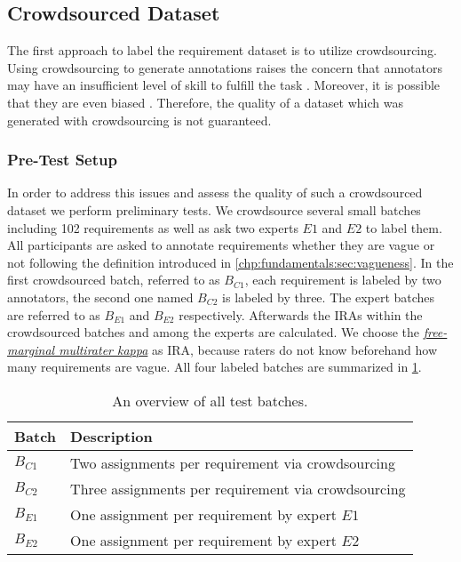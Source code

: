 \subsection{Crowdsourced Dataset}
\label{chp:study:sec:study_objects:crowdsourced_dataset}

The first approach to label the requirement dataset is to utilize crowdsourcing.
Using crowdsourcing to generate annotations raises the concern that annotators may have an insufficient level of skill to fulfill the task \parencite{Quinn:2011}.
Moreover, it is possible that they are even biased \parencite{Kittur:2008}.
Therefore, the quality of a dataset which was generated with crowdsourcing is not guaranteed.

\subsubsection{Pre-Test Setup}
In order to address this issues and assess the quality of such a crowdsourced dataset we perform preliminary tests.
We crowdsource several small batches including 102 requirements as well as ask two experts $E1$ and $E2$ to label them.
All participants are asked to annotate requirements whether they are vague or not following the definition introduced in \cref{chp:fundamentals:sec:vagueness}.
In the first crowdsourced batch, referred to as $B_{C1}$, each requirement is labeled by two annotators, the second one named $B_{C2}$ is labeled by three.
The expert batches are referred to as $B_{E1}$ and $B_{E2}$ respectively.
Afterwards the \acp{IRA} within the crowdsourced batches and among the experts are calculated.
We choose the \hyperref[chp:fundamentals:sec:inter_rater_agreement:subsec:free_marginal_multirater_kappa]{\textit{free-marginal multirater kappa}} as \ac{IRA}, because raters do not know beforehand how many requirements are vague.
All four labeled batches are summarized in \cref{tab:study:objects:crowdsourcing:batches}.
\begin{table}[htpb]
    \centering
    \begin{tabular}{l l}
        \toprule
        Batch & Description \\
        \midrule
        $B_{C1}$ & Two assignments per requirement via crowdsourcing\\
        $B_{C2}$ & Three assignments per requirement via crowdsourcing\\
        $B_{E1}$ & One assignment per requirement by expert $E1$ \\
        $B_{E2}$ & One assignment per requirement by expert $E2$ \\
        \bottomrule
    \end{tabular}
    \caption[Overview of test batches]{An overview of all test batches.}\label{tab:study:objects:crowdsourcing:batches}
\end{table}

